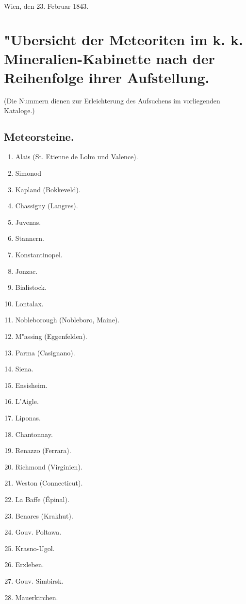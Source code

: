 \documentclass[a4paper, 11pt, oneside, polutonikogreek, german]{article}
\begin{document}
Wien, den 23. Februar 1843.
\clearpage
\section{"Ubersicht der Meteoriten im k. k. Mineralien-Kabinette nach der Reihenfolge ihrer Aufstellung.}
\begin{center}
\small
(Die Nummern dienen zur Erleichterung des Aufsuchens im vorliegenden Kataloge.)
\end{center}
\subsection{Meteorsteine.}
\begin{enumerate}
    \small
    \item Alais (St. Etienne de Lolm und Valence).
    \item Simonod
    \item Kapland (Bokkeveld).
    \item Chassigny (Langres).
    \item Juvenas.
    \item Stannern.
    \item Konstantinopel.
    \item Jonzac.
    \item Bialistock.
    \item Lontalax.
    \item Nobleborough (Nobleboro, Maine).
    \item M"assing (Eggenfelden).
    \item Parma (Casignano).
    \item Siena.
    \item Ensisheim.
    \item L'Aigle.
    \item Liponas.
    \item Chantonnay.
    \item Renazzo (Ferrara).
    \item Richmond (Virginien).
    \item Weston (Connecticut).
    \item La Baffe (Épinal).
    \item Benares (Krakhut).
    \item Gouv. Poltawa.
    \item Krasno-Ugol.
    \item Erxleben.
    \item Gouv. Simbirsk.
    \item Mauerkirchen.

\end{enumerate}
\end{document}
